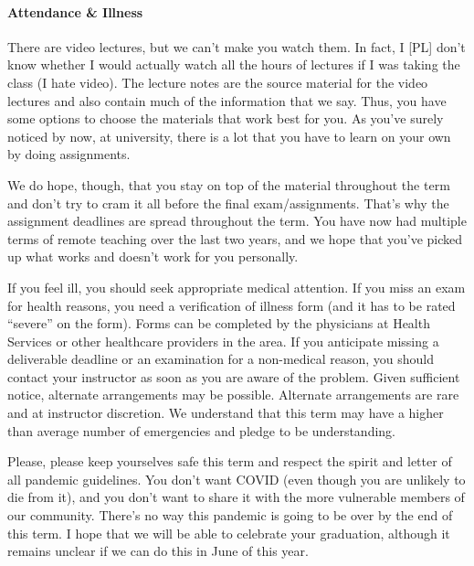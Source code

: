 \documentclass[letterpaper,10pt]{article}
\begin{document}
\paragraph{Attendance \& Illness}

There are video lectures, but we can't make you watch them. In fact, I [PL] don't know whether I would actually watch all the hours of lectures if I was taking the class (I hate video). The lecture notes are the source material for the video lectures and also contain much of the information that we say. Thus, you have some options to choose the materials that work best for you. As you've surely noticed by now, at university, there is a lot that you have to learn on your own by doing assignments.

We do hope, though, that you stay on top of the material throughout the term and don't try to cram it all before the final exam/assignments. That's why the assignment deadlines are spread throughout the term. You have now had multiple terms of remote teaching over the last two years, and we hope that you've picked up what works and doesn't work for you personally.



If you feel ill, you should seek appropriate medical attention. If you miss an exam for health reasons, you need a verification of illness form (and it has to be rated ``severe'' on the form). Forms can be completed by the physicians at Health Services or other healthcare providers in the area. If you anticipate missing a deliverable deadline or an examination for a non-medical reason, you should contact your instructor as soon as you are aware of the problem. Given sufficient notice, alternate arrangements may be possible. Alternate arrangements are rare and at instructor discretion. We understand that this term may have a higher than average number of emergencies and pledge to be understanding.

Please, please keep yourselves safe this term and respect the spirit and letter of all pandemic guidelines. You don't want COVID (even though you are unlikely to die from it), and you don't want to share it with the more vulnerable members of our community. There's no way this pandemic is going to be over by the end of this term. I hope that we will be able to celebrate your graduation, although it remains unclear if we can do this in June of this year. 
\end{document}
